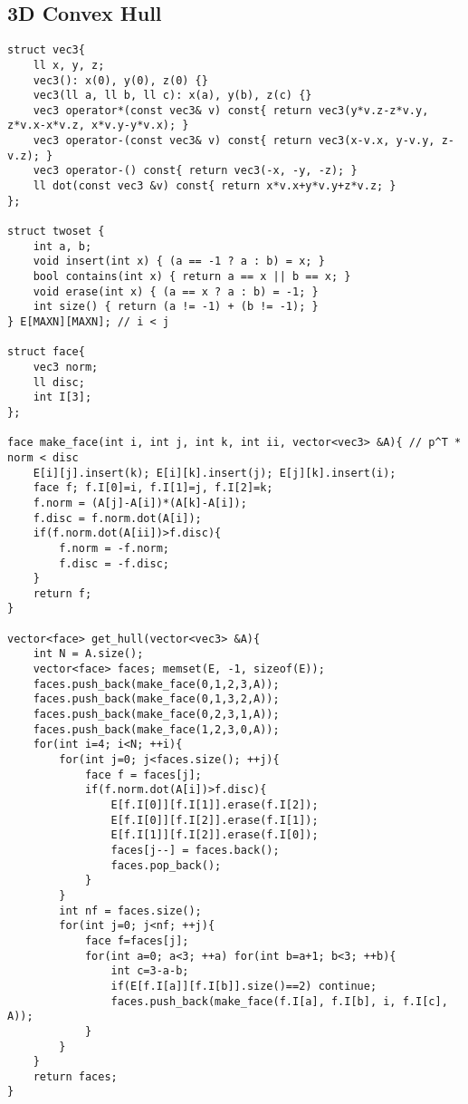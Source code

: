 \documentclass[landscape, 8pt, a4paper, oneside, twocolumn]{extarticle}
\begin{document}
\subsection{3D Convex Hull}
\begin{verbatim}
struct vec3{
	ll x, y, z;
	vec3(): x(0), y(0), z(0) {}
	vec3(ll a, ll b, ll c): x(a), y(b), z(c) {}
	vec3 operator*(const vec3& v) const{ return vec3(y*v.z-z*v.y, z*v.x-x*v.z, x*v.y-y*v.x); }
	vec3 operator-(const vec3& v) const{ return vec3(x-v.x, y-v.y, z-v.z); }
	vec3 operator-() const{ return vec3(-x, -y, -z); }
	ll dot(const vec3 &v) const{ return x*v.x+y*v.y+z*v.z; }
};

struct twoset {
	int a, b;
	void insert(int x) { (a == -1 ? a : b) = x; }
	bool contains(int x) { return a == x || b == x; }
	void erase(int x) { (a == x ? a : b) = -1; }
	int size() { return (a != -1) + (b != -1); }
} E[MAXN][MAXN]; // i < j

struct face{
	vec3 norm;
	ll disc;
	int I[3];
};

face make_face(int i, int j, int k, int ii, vector<vec3> &A){ // p^T * norm < disc
	E[i][j].insert(k); E[i][k].insert(j); E[j][k].insert(i);
	face f; f.I[0]=i, f.I[1]=j, f.I[2]=k;
	f.norm = (A[j]-A[i])*(A[k]-A[i]);
	f.disc = f.norm.dot(A[i]);
	if(f.norm.dot(A[ii])>f.disc){
		f.norm = -f.norm;
		f.disc = -f.disc;
	}
	return f;
}

vector<face> get_hull(vector<vec3> &A){
	int N = A.size();
	vector<face> faces; memset(E, -1, sizeof(E));
	faces.push_back(make_face(0,1,2,3,A));
	faces.push_back(make_face(0,1,3,2,A));
	faces.push_back(make_face(0,2,3,1,A));
	faces.push_back(make_face(1,2,3,0,A));
	for(int i=4; i<N; ++i){
		for(int j=0; j<faces.size(); ++j){
			face f = faces[j];
			if(f.norm.dot(A[i])>f.disc){
				E[f.I[0]][f.I[1]].erase(f.I[2]);
				E[f.I[0]][f.I[2]].erase(f.I[1]);
				E[f.I[1]][f.I[2]].erase(f.I[0]);
				faces[j--] = faces.back();
				faces.pop_back();
			}
		}
		int nf = faces.size();
		for(int j=0; j<nf; ++j){
			face f=faces[j];
			for(int a=0; a<3; ++a) for(int b=a+1; b<3; ++b){
				int c=3-a-b;
				if(E[f.I[a]][f.I[b]].size()==2) continue;
				faces.push_back(make_face(f.I[a], f.I[b], i, f.I[c], A));
			}
		}
	}
	return faces;
}
\end{verbatim}
\end{document}
